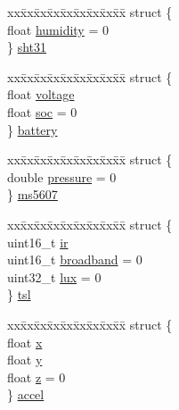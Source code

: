 \begin{DoxyCompactItemize}
\begin{tabbing}
\end{tabbing}\item 
\begin{tabbing}
xx\=xx\=xx\=xx\=xx\=xx\=xx\=xx\=xx\=\kill
struct \{\\
\>float \hyperlink{structdata__struct_a629b9280db11d568e378b0cb9330bee7}{humidity} = 0\\
\} \hyperlink{structdata__struct_a97c2e1e9042cd4bb3125779e96e1852a}{sht31}\\

\end{tabbing}\item 
\begin{tabbing}
xx\=xx\=xx\=xx\=xx\=xx\=xx\=xx\=xx\=\kill
struct \{\\
\>float \hyperlink{structdata__struct_aff54c50179e77b9e77f28244e1b6c7ed}{voltage}\\
\>float \hyperlink{structdata__struct_a3accfbed388d6da43a648bd29a79c7fb}{soc} = 0\\
\} \hyperlink{structdata__struct_ab563098c74eb5e8c7b3deafc91c30908}{battery}\\

\end{tabbing}\item 
\begin{tabbing}
xx\=xx\=xx\=xx\=xx\=xx\=xx\=xx\=xx\=\kill
struct \{\\
\>double \hyperlink{structdata__struct_a5d0a52f39801cac8ea17a1a57421bee6}{pressure} = 0\\
\} \hyperlink{structdata__struct_a66a25e7f8b144d70d91ad0a9f7703cb1}{ms5607}\\

\end{tabbing}\item 
\begin{tabbing}
xx\=xx\=xx\=xx\=xx\=xx\=xx\=xx\=xx\=\kill
struct \{\\
\>uint16\_t \hyperlink{structdata__struct_aa15055b51a5113db435edf1103c4c41a}{ir}\\
\>uint16\_t \hyperlink{structdata__struct_a1a2ad01e2e7999b77a63d839193b84a1}{broadband} = 0\\
\>uint32\_t \hyperlink{structdata__struct_ae4d58436614c3a53290c15fb4b1c6a54}{lux} = 0\\
\} \hyperlink{structdata__struct_ad6c6ac99773f308db955031c4ac87d72}{tsl}\\

\end{tabbing}\item 
\begin{tabbing}
xx\=xx\=xx\=xx\=xx\=xx\=xx\=xx\=xx\=\kill
struct \{\\
\>float \hyperlink{structdata__struct_aafb6ee9f998bdf479137e058e54c8605}{x}\\
\>float \hyperlink{structdata__struct_a907e433dba309a2e973da7f346b8d619}{y}\\
\>float \hyperlink{structdata__struct_a99537ca31fb73ac23386af3748921b53}{z} = 0\\
\} \hyperlink{structdata__struct_a3fca2ed772020080d3e4c2311a240933}{accel}\\


\end{tabbing}
\end{DoxyCompactItemize}
